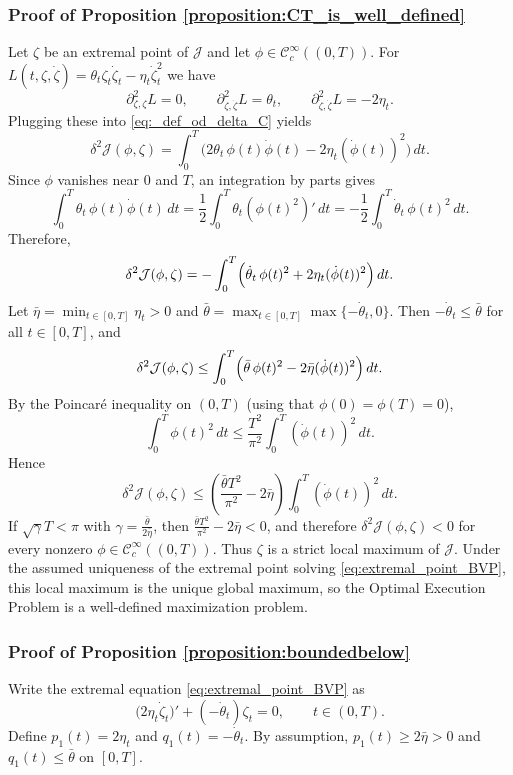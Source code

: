 \documentclass[final,3p,authoryear,12pt]{elsarticle}
\begin{document}
\subsubsection{Proof of Proposition \ref{proposition:CT_is_well_defined}}
\label{proof:proposition:CT_is_well_defined}
Let $\zeta$ be an extremal point of $\mathcal{J}$ and let
$\phi\in \mathcal{C}^{\infty}_{c}((0,T))$. For
$L(t,\zeta,\dot\zeta)=\theta_t\zeta_t\dot\zeta_t-\eta_t\dot\zeta_t^{2}$ we have
\[
\partial^{2}_{\zeta,\zeta}L=0,\qquad
\partial^{2}_{\zeta,\dot\zeta}L=\theta_t,\qquad
\partial^{2}_{\dot\zeta,\dot\zeta}L=-2\eta_t.
\]
Plugging these into \eqref{eq:_def_od_delta_C} yields
\[
\delta^{2}\mathcal{J}(\phi,\zeta)
=\int_{0}^{T}\bigl(2\theta_t\,\phi(t)\dot\phi(t)-2\eta_t(\dot\phi(t))^{2}\bigr)\,dt.
\]
Since $\phi$ vanishes near $0$ and $T$, an integration by parts gives
\[
\int_{0}^{T}\theta_t\,\phi(t)\dot\phi(t)\,dt
=\frac12\int_{0}^{T}\theta_t(\phi(t)^{2})'\,dt
=-\frac12\int_{0}^{T}\dot\theta_t\,\phi(t)^{2}\,dt.
\]
Therefore,
\[
\delta^{2}\mathcal{J}(\phi,\zeta)
=-\int_{0}^{T}\Bigl(\dot\theta_t\,\phi(t)^{2}+2\eta_t(\dot\phi(t))^{2}\Bigr)\,dt.
\]
Let $\bar\eta=\min_{t\in[0,T]}\eta_t>0$ and
$\bar\theta=\max_{t\in[0,T]}\max\{-\dot\theta_t,0\}$. Then
$-\dot\theta_t\le \bar\theta$ for all $t\in[0,T]$, and
\[
\delta^{2}\mathcal{J}(\phi,\zeta)
\le
\int_{0}^{T}\Bigl(\bar\theta\,\phi(t)^{2}-2\bar\eta(\dot\phi(t))^{2}\Bigr)\,dt.
\]
By the Poincar\'e inequality on $(0,T)$ (using that $\phi(0)=\phi(T)=0$),
\[
\int_{0}^{T}\phi(t)^{2}\,dt \le \frac{T^{2}}{\pi^{2}}\int_{0}^{T}(\dot\phi(t))^{2}\,dt.
\]
Hence
\[
\delta^{2}\mathcal{J}(\phi,\zeta)
\le
\left(\frac{\bar\theta T^{2}}{\pi^{2}}-2\bar\eta\right)\int_{0}^{T}(\dot\phi(t))^{2}\,dt.
\]
If $\sqrt{\gamma}T<\pi$ with $\gamma=\frac{\bar\theta}{2\bar\eta}$, then
$\frac{\bar\theta T^{2}}{\pi^{2}}-2\bar\eta<0$, and therefore
$\delta^{2}\mathcal{J}(\phi,\zeta)<0$ for every nonzero
$\phi\in \mathcal{C}^{\infty}_{c}((0,T))$. Thus $\zeta$ is a strict local
maximum of $\mathcal{J}$. Under the assumed uniqueness of the extremal point
solving \eqref{eq:extremal_point_BVP}, this local maximum is the unique global
maximum, so the Optimal Execution Problem is a well-defined maximization
problem.

\subsubsection{Proof of Proposition \ref{proposition:boundedbelow}}

Write the extremal equation \eqref{eq:extremal_point_BVP} as
\[
\bigl(2\eta_t\dot\zeta_t\bigr)'+(-\dot\theta_t)\zeta_t=0,
\qquad t\in(0,T).
\]
Define $p_1(t)=2\eta_t$ and $q_1(t)=-\dot\theta_t$. By assumption,
$p_1(t)\ge 2\bar\eta>0$ and $q_1(t)\le\bar\theta$ on $[0,T]$.
\end{document}
